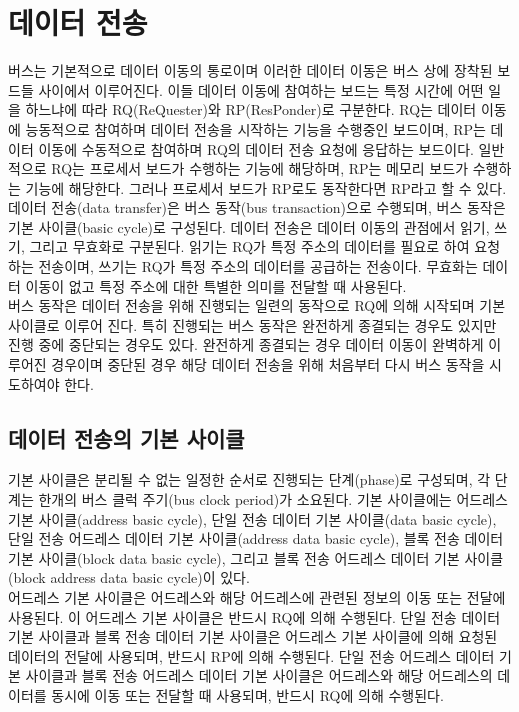 %
%
\section{데이터 전송}
버스는 기본적으로 데이터 이동의 통로이며 이러한 데이터 이동은 버스 상에 장착된 
보드들 사이에서 이루어진다. 이들 데이터 이동에 참여하는 보드는 특정 시간에 어떤 일을 하느냐에 따라
RQ(ReQuester)와 RP(ResPonder)로 구분한다.
RQ는 데이터 이동에 능동적으로 참여하며 데이터 전송을 시작하는 기능을 수행중인 보드이며,
RP는 데이터 이동에 수동적으로 참여하며 RQ의 데이터 전송 요청에 응답하는 보드이다.
일반적으로 RQ는 프로세서 보드가 수행하는 기능에 해당하며, RP는 메모리 보드가 수행하는 기능에 해당한다.
그러나 프로세서 보드가 RP로도 동작한다면 RP라고 할 수 있다. \\
데이터 전송(data transfer)은 버스 동작(bus transaction)으로 수행되며,
버스 동작은 기본 사이클(basic cycle)로 구성된다.
데이터 전송은 데이터 이동의 관점에서 읽기, 쓰기, 그리고 무효화로 구분된다.
읽기는 RQ가 특정 주소의 데이터를 필요로 하여 요청하는 전송이며,
쓰기는 RQ가 특정 주소의 데이터를 공급하는 전송이다.
무효화는 데이터 이동이 없고 특정 주소에 대한 특별한 의미를 전달할 때 사용된다.\\
버스 동작은 데이터 전송을 위해 진행되는 일련의 동작으로 RQ에 의해 시작되며
기본 사이클로 이루어 진다. 특히 진행되는 버스 동작은 완전하게 종결되는 경우도
있지만 진행 중에 중단되는 경우도 있다. 완전하게 종결되는 경우 데이터 이동이
완벽하게 이루어진 경우이며 중단된 경우 해당 데이터 전송을 위해 처음부터 다시
버스 동작을 시도하여야 한다. \\
%
\subsection{데이터 전송의 기본 사이클}
기본 사이클은 분리될 수 없는 일정한 순서로 진행되는 단계(phase)로 구성되며,
각 단계는 한개의 버스 클럭 주기(bus clock period)가 소요된다.
기본 사이클에는 어드레스 기본 사이클(address basic cycle),
단일 전송 데이터 기본 사이클(data basic cycle), 단일 전송 어드레스 데이터 기본 사이클(address
data basic cycle), 블록 전송 데이터 기본 사이클(block data basic cycle),
그리고 블록 전송 어드레스 데이터 기본 사이클(block address data basic cycle)이 있다. \\
어드레스 기본 사이클은 어드레스와 해당 어드레스에 관련된 정보의 이동 또는 전달에 사용된다.
이 어드레스 기본 사이클은 반드시 RQ에 의해 수행된다.
단일 전송 데이터 기본 사이클과 블록 전송 데이터 기본 사이클은
어드레스 기본 사이클에 의해 요청된 데이터의 전달에 사용되며,
반드시 RP에 의해 수행된다.
단일 전송 어드레스 데이터 기본 사이클과 블록 전송 어드레스 데이터 기본 사이클은
어드레스와 해당 어드레스의 데이터를 동시에 이동 또는 전달할 때 사용되며,
반드시 RQ에 의해 수행된다.
%
